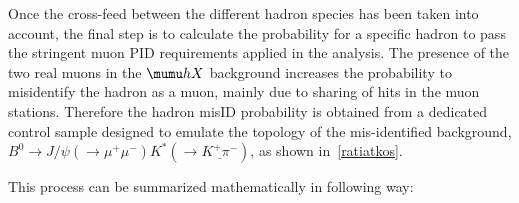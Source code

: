 Once the cross-feed between the different hadron species has been taken into account, the final step is to calculate the probability for
a specific hadron to pass the stringent muon \gls{PID} requirements applied in the analysis. The presence of the two real muons in the $\mumu h X$
background increases the probability to misidentify the hadron as a muon, mainly due to sharing of hits in the muon stations. Therefore the hadron misID probability is obtained from a dedicated control sample designed to emulate the topology of the mis-identified background,
 $B^{0} \rightarrow J/\psi(\rightarrow \mu^{+} \mu^{-}) K^{*}(\rightarrow \underline{K^{+} \pi^{-}})$, as shown in~\autoref{ratiatkos}.


This process can be summarized mathematically in \DIFdelbegin {}\DIFdelend \DIFaddbegin {}\DIFaddend following way:

